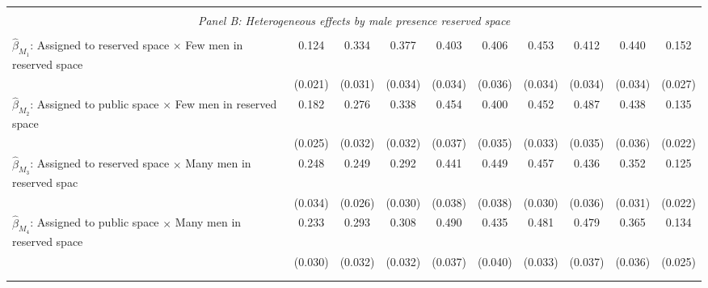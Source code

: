 \begin{tabular}{l*{9}{c}}
\hline \\[-1ex] \multicolumn{10}{c}{\textit{Panel B: Heterogeneous effects by male presence reserved space}} \\\\[-1ex]
$\hat\beta_{M_1}$: Assigned to reserved space $\times$ Few men in reserved space&       0.124\sym{***}&       0.334\sym{***}&       0.377\sym{***}&       0.403\sym{***}&       0.406\sym{***}&       0.453\sym{***}&       0.412\sym{***}&       0.440\sym{***}&       0.152\sym{***}\\
                    &     (0.021)         &     (0.031)         &     (0.034)         &     (0.034)         &     (0.036)         &     (0.034)         &     (0.034)         &     (0.034)         &     (0.027)         \\
[1em]
$\hat\beta_{M_2}$: Assigned to public space $\times$ Few men in reserved space&       0.182\sym{***}&       0.276\sym{***}&       0.338\sym{***}&       0.454\sym{***}&       0.400\sym{***}&       0.452\sym{***}&       0.487\sym{***}&       0.438\sym{***}&       0.135\sym{***}\\
                    &     (0.025)         &     (0.032)         &     (0.032)         &     (0.037)         &     (0.035)         &     (0.033)         &     (0.035)         &     (0.036)         &     (0.022)         \\
[1em]
$\hat\beta_{M_3}$: Assigned to reserved space $\times$ Many men in reserved spac&       0.248\sym{***}&       0.249\sym{***}&       0.292\sym{***}&       0.441\sym{***}&       0.449\sym{***}&       0.457\sym{***}&       0.436\sym{***}&       0.352\sym{***}&       0.125\sym{***}\\
                    &     (0.034)         &     (0.026)         &     (0.030)         &     (0.038)         &     (0.038)         &     (0.030)         &     (0.036)         &     (0.031)         &     (0.022)         \\
[1em]
$\hat\beta_{M_4}$: Assigned to public space $\times$ Many men in reserved space&       0.233\sym{***}&       0.293\sym{***}&       0.308\sym{***}&       0.490\sym{***}&       0.435\sym{***}&       0.481\sym{***}&       0.479\sym{***}&       0.365\sym{***}&       0.134\sym{***}\\
                    &     (0.030)         &     (0.032)         &     (0.032)         &     (0.037)         &     (0.040)         &     (0.033)         &     (0.037)         &     (0.036)         &     (0.025)         \\
\\[-1.8ex] \hline \\[-1.8ex]  

\end{tabular}
